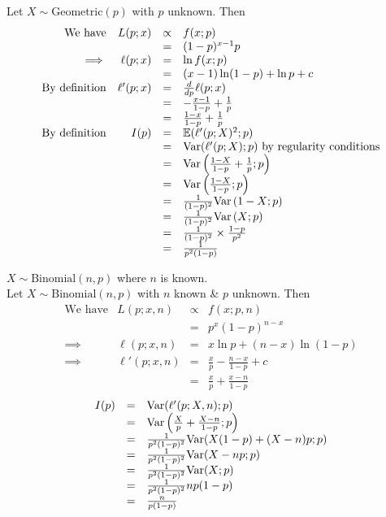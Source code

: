 \documentclass[11pt,a4paper]{article}
\begin{document}
\apart
Let $X\sim\text{Geometric}(p)$ with $p$ unknown. Then
\[\begin{array}{rrcl}
\text{We have}&L(p;x)&\propto&f(x;p)\\
&&=&(1-p)^{x-1}p\\
\implies&\ell(p;x)&=&\ln f(x;p)\\
&&=&(x-1)\ln(1-p)+\ln p+c\\
\text{By definition}&\ell'(p;x)&=&\frac{d}{dp}\ell(p;x)\\
&&=&-\frac{x-1}{1-p}+\frac{1}{p}\\
&&=&\frac{1-x}{1-p}+\frac{1}{p}\\
\text{By definition}&I(p)&=&\mathbb{E}(\ell'(p;X)^2;p)\\
&&=&\mathrm{Var}(\ell'(p;X);p)\text{ by regularity conditions}\\
&&=&\mathrm{Var}\left(\frac{1-X}{1-p}+\frac{1}{p};p\right)\\
&&=&\mathrm{Var}\left(\frac{1-X}{1-p};p\right)\\
&&=&\frac{1}{(1-p)^2}\mathrm{Var}\left(1-X;p\right)\\
&&=&\frac{1}{(1-p)^2}\mathrm{Var}\left(X;p\right)\\
&&=&\frac{1}{(1-p)^2}\times\frac{1-p}{p^2}\\
&&=&\frac{1}{p^2(1-p)}
\end{array}\]

\qpartt
$X\sim\text{Binomial}(n,p)$ where $n$ is known.\\

\apart
Let $X\sim\text{Binomial}(n,p)$ with $n$ known \& $p$ unknown. Then
\[\begin{array}{rrcl}
\text{We have}&L(p;x,n)&\propto&f(x;p,n)\\
&&=&p^x(1-p)^{n-x}\\
\implies&\ell(p;x,n)&=&x\ln p+(n-x)\ln(1-p)\\
\implies&\ell'(p;x,n)&=&\frac{x}{p}-\frac{n-x}{1-p}+c\\
&&=&\frac{x}{p}+\frac{x-n}{1-p}
\end{array}\]
\[\begin{array}{rcl}
I(p)&=&\mathrm{Var}(\ell'(p;X,n);p)\\
&=&\mathrm{Var}\left(\frac{X}{p}+\frac{X-n}{1-p};p\right)\\
&=&\frac{1}{p^2(1-p)^2}\mathrm{Var}(X(1-p)+(X-n)p;p)\\
&=&\frac{1}{p^2(1-p)^2}\mathrm{Var}(X-np;p)\\
&=&\frac{1}{p^2(1-p)^2}\mathrm{Var}(X;p)\\
&=&\frac{1}{p^2(1-p)^2}np(1-p)\\
&=&\frac{n}{p(1-p)}
\end{array}\]
\end{document}
